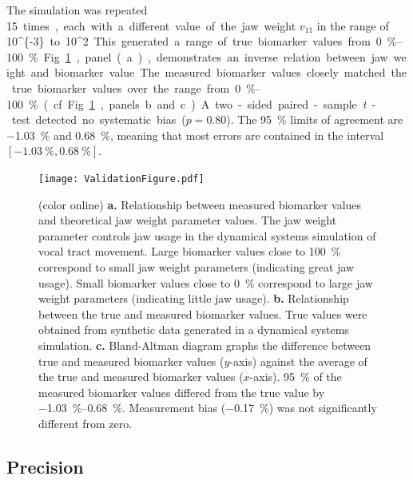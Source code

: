 \documentclass[preprint]{JASAnew}\usepackage[]{graphicx}\usepackage[]{color}
\begin{document}
The simulation was repeated \SI{15} times, each with a different value of the jaw weight $v_{11}$ in the range of \SI[parse-numbers=false]{10^{-3}} to \SI[parse-numbers=false]{10^2}. This generated a range of true biomarker values from \SIrange{0}{100}{\percent}. Fig.~\ref{fig:valfig}, panel (a), demonstrates an inverse relation between jaw weight and biomarker value. The measured biomarker values closely matched the true biomarker values over the range from~\SIrange{0}{100}{\percent} (cf. Fig.~\ref{fig:valfig}, panels b and c). A two-sided paired-sample \textit{t}-test detected no systematic bias ($p = 0.80$). The \SI{95}{\percent} limits of agreement are \SI{-1.03}{\percent} and \SI{0.68}{\percent}, meaning that most errors are contained in the interval $[\SI{-1.03}{\percent},\SI{0.68}{\percent}]$.

\begin{figure}
\centering
\texttt{[image: ValidationFigure.pdf]}
\caption{(color online) {\bf a.} Relationship between measured biomarker values and theoretical jaw weight parameter values. The jaw weight parameter controls jaw usage in the dynamical systems simulation of vocal tract movement. Large biomarker values close to \SI{100}{\percent} correspond to small jaw weight parameters (indicating great jaw usage). Small biomarker values close to \SI{0}{\percent} correspond to large jaw weight parameters (indicating little jaw usage).
{\bf b.} Relationship between the true and measured biomarker values. True values were obtained from synthetic data generated in a dynamical systems simulation.
{\bf c.} Bland-Altman diagram graphs the difference between true and measured biomarker values ($y$-axis) against the average of the true and measured biomarker values ($x$-axis). \SI{95}{\percent} of the measured biomarker values differed from the true value by \SIrange{-1.03}{0.68}{\percent}. Measurement bias (\SI{-0.17}{\percent}) was not significantly different from zero.}
\label{fig:valfig}
\end{figure}

\subsection{Precision}
\label{subsec:repeatability}
\end{document}
